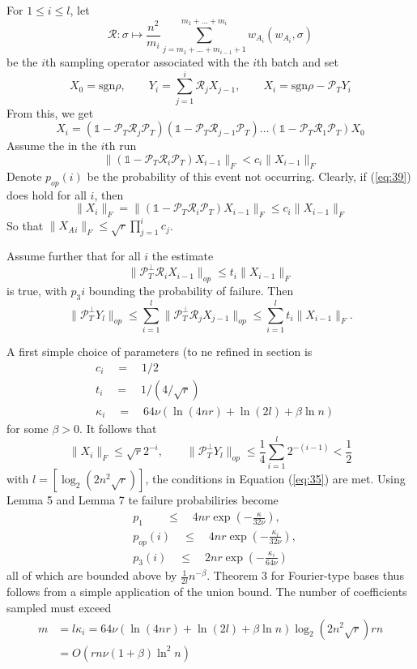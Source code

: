 \documentclass{article}
\begin{document}
For $1\le i \le l$, let
\[
\mathcal{R}: \sigma \mapsto \frac{n^2}{m_i}\sum_{j=m_1+\dots+m_{i-1}+1}^{m_1+\dots+m_i} w_{A_i}( w_{A_i},\sigma)
\]
be the $i$th sampling operator associated with the $i$th batch and set
\[
X_0 = \text{sgn}\rho, \qquad Y_i = \sum_{j=1}^i\mathcal{R}_j X_{j-1}, \qquad X_i = \text{sgn}\rho - \mathcal{P}_TY_i
\]
From this, we get
\begin{equation}
X_i = (\mathbb{1}-\mathcal{P}_T\mathcal{R}_j\mathcal{P}_T)(\mathbb{1}-\mathcal{P}_T\mathcal{R}_{j-1}\mathcal{P}_T)\dots(\mathbb{1}-\mathcal{P}_T\mathcal{R}_1\mathcal{P}_T)X_0
\end{equation}
Assume the in the $i$th run
\begin{equation}
\| (\mathbb{1}-\mathcal{P}_T\mathcal{R}_i\mathcal{P}_T) X_{i-1}\|_F < c_i\|X_{i-1}\|_F
\label{eq:39}
\end{equation}
Denote $p_{op}(i)$ be the probability of this event not occurring. Clearly, if (\ref{eq:39}) does hold for all $i$, then
\[
\|X_i\|_F = \|(\mathbb{1}-\mathcal{P}_T\mathcal{R}_i\mathcal{P}_T) X_{i-1}\|_F \le c_i\|X_{i-1}\|_F
\]
So that $\|X_A{_i}\|_F \le \sqrt{r}\prod_{j=1}^i c_j$.

Assume further that for all $i$ the estimate 
\[
\|\mathcal{P}_T^\perp \mathcal{R}_i X_{i-1}\|_{op} \le t_i\|X_{i-1}\|_F
\] 
is true, with $p_3{i}$ bounding the probability of failure.
Then
\[
\|\mathcal{P}_T^\perp Y_l\|_{op} \le \sum_{i=1}^l\|\mathcal{P}_T^\perp \mathcal{R}_j X_{j-1}\|_{op} \le \sum_{i=1}^l t_i \|X_{i-1}\|_F.
\]

A first simple choice of parameters (to ne refined in section \uppercase\expandafter{} is
\begin{align*}
& c_i\quad =\quad 1/2\\
& t_i\quad =\quad 1/(4/\sqrt{r})\\
& \kappa_i\quad = \quad 64\nu(\ln(4nr)+\ln(2l)+\beta \ln n)
\end{align*}
for some $\beta > 0$. It follows that 
\[
\|X_i\|_F \le \sqrt{r}2^{-i}, \qquad \|\mathcal{P}_T^\perp Y_l\|_{op} \le \frac{1}{4} \sum_{i=1}^l 2^{-(i-1)} < \frac{1}{2}
\]
with $l = [\log_2(2n^2\sqrt{r})]$, the conditions in Equation (\ref{eq:35}) are met. Using Lemma 5 and Lemma 7 te failure probabiliries become
\begin{align*}
&p_1 \qquad \le \quad 4nr \exp \left( -\frac{\kappa}{32\nu}\right),\\
&p_{op}(i)\quad \le \quad  4nr \exp \left( -\frac{\kappa_i}{32\nu}\right),\\
&p_3(i)\quad \le \quad  2nr \exp \left( -\frac{\kappa_i}{64\nu}\right)
\end{align*}
all of which are bounded above by $\frac{1}{2l}n^{-\beta}$. Theorem 3 for Fourier-type bases thus follows from a simple application of the union bound. The number of coefficients sampled must exceed
\begin{align*}
m &=l\kappa_i = 64\nu(\ln(4nr)+\ln(2l)+\beta \ln n)\log_2(2n^2\sqrt{r})rn\\
& = O(rn\nu (1+\beta)\ln^2n)
\end{align*}
\end{document}
